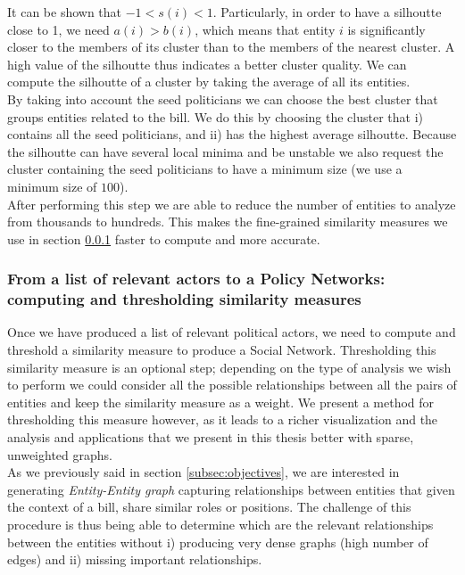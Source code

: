 It can be shown that $ -1 < s(i) <1 $. Particularly, in order to have a silhoutte close to 1, we need $a(i)>b(i)$, which means that entity $i$ is significantly closer to the members of its cluster than to the members of the nearest cluster. A high value of the silhoutte thus indicates a better cluster quality. We can compute the silhoutte of a cluster by taking the average of all its entities.\\

By taking into account the seed politicians we can choose the best cluster that groups entities related to the bill. We do this by choosing the cluster that i) contains all the seed politicians,  and ii) has the highest average silhoutte.  Because the silhoutte can have several local minima and be unstable  we also request the cluster containing the seed politicians to have a minimum size (we use a minimum size of $100$).\\

After performing this step we are able to reduce the number of entities to analyze from thousands to hundreds. This makes the fine-grained similarity measures we use in section \ref{entity-entity-sim} faster to compute and more accurate.

\subsubsection{From a list of relevant actors to a Policy Networks: computing and thresholding similarity measures}\label{entity-entity-sim}

Once we have produced a list of relevant political actors, we need to compute and threshold a similarity measure to produce a Social Network. Thresholding this similarity measure is an optional step; depending on the type of analysis we wish to perform we could consider all the possible relationships between all the pairs of entities and keep the similarity measure as a weight. We present a method for thresholding this measure however, as it leads to a richer visualization and the analysis and applications that we present in this thesis better with sparse, unweighted graphs.\\

As we previously said in section \ref{subsec:objectives}, we are interested in generating \emph{Entity-Entity graph} capturing relationships between entities that given the context of a bill, share similar roles or positions. The challenge of this procedure is thus being able to determine which are the relevant relationships between the entities without i) producing very dense graphs (high number of edges) and ii) missing important relationships. \\

